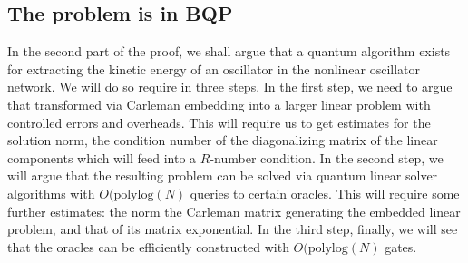 \documentclass[superscriptaddress,onecolumn,nofootinbib,longbibliography,a4paper,accepted=2026-09-29]{quantumarticle}
\theoremstyle{plain}
\theoremstyle{definition}
\numberwithin{thm}{section}
\numberwithin{assumption}{section}
\numberwithin{lemma}{section}
\numberwithin{prop}{section}
\numberwithin{cor}{section}
\numberwithin{definition}{section}
\numberwithin{rmk}{section}
\numberwithin{equation}{section}
\begin{document}

\subsection{The problem is in BQP}

In the second part of the proof, we shall argue that a quantum algorithm exists for extracting the kinetic energy of an oscillator in the nonlinear oscillator network. We will do so require in three steps. In the first step, we need to argue that transformed via Carleman embedding into a larger linear problem with controlled errors and overheads. This will require us to get estimates for the solution norm, the condition number of the diagonalizing matrix of the linear components which will feed into a $R$-number condition. In the second step, we will argue that the resulting problem can be  solved via quantum linear solver algorithms with $O(\mathrm{polylog}(N)$ queries to certain oracles. This will require some further estimates: the norm the Carleman matrix generating the embedded linear problem, and that of its matrix exponential. In the third step, finally, we will see that the oracles can be efficiently constructed with $O(\mathrm{polylog}(N)$ gates.

\bigskip
\end{document}
